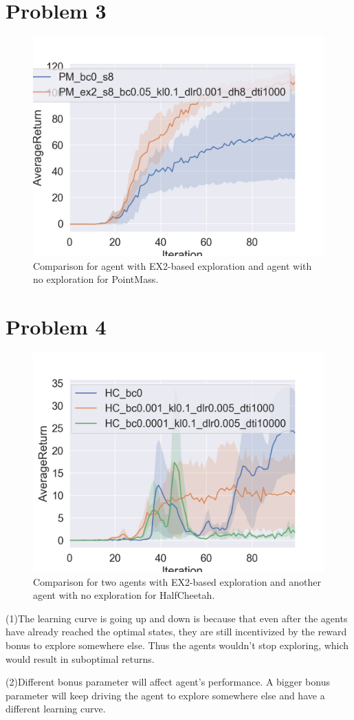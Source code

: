 \documentclass[12pt]{article}
\begin{document}
\newpage

\section{Problem 3}
\begin{figure}[!h]
\centering
\includegraphics[width=5in]{3.png}
\caption{Comparison for agent with EX2-based exploration and
agent with no exploration for PointMass.}
\end{figure}

\newpage

\section{Problem 4}
\begin{figure}[!h]
\centering
\includegraphics[width=5in]{4.png}
\caption{Comparison for two agents with EX2-based exploration and
another agent with no exploration for HalfCheetah.}
\end{figure}
(1)The learning curve is going up and down is because that even after the agents have already reached the optimal states, they are still incentivized by the reward bonus to explore somewhere else. Thus the agents wouldn't stop exploring, which would result in suboptimal returns.

(2)Different bonus parameter will affect agent's performance. A bigger bonus parameter will keep driving the agent to explore somewhere else and have a different learning curve.
\newpage
\end{document}
